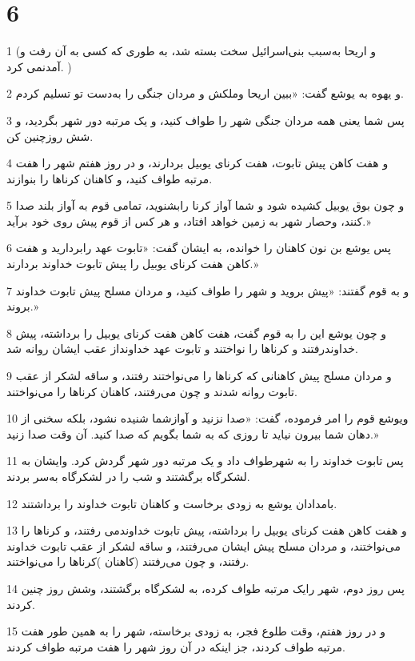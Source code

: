 \chapter{6}

\par 1 (و اریحا به‌سبب بنی‌اسرائیل سخت بسته شد، به طوری که کسی به آن رفت و آمدنمی کرد. )
\par 2 و یهوه به یوشع گفت: «ببین اریحا وملکش و مردان جنگی را به‌دست تو تسلیم کردم.
\par 3 پس شما یعنی همه مردان جنگی شهر را طواف کنید، و یک مرتبه دور شهر بگردید، و شش روزچنین کن.
\par 4 و هفت کاهن پیش تابوت، هفت کرنای یوبیل بردارند، و در روز هفتم شهر را هفت مرتبه طواف کنید، و کاهنان کرناها را بنوازند.
\par 5 و چون بوق یوبیل کشیده شود و شما آواز کرنا رابشنوید، تمامی قوم به آواز بلند صدا کنند، وحصار شهر به زمین خواهد افتاد، و هر کس از قوم پیش روی خود برآید.»
\par 6 پس یوشع بن نون کاهنان را خوانده، به ایشان گفت: «تابوت عهد رابردارید و هفت کاهن هفت کرنای یوبیل را پیش تابوت خداوند بردارند.»
\par 7 و به قوم گفتند: «پیش بروید و شهر را طواف کنید، و مردان مسلح پیش تابوت خداوند بروند.»
\par 8 و چون یوشع این را به قوم گفت، هفت کاهن هفت کرنای یوبیل را برداشته، پیش خداوندرفتند و کرناها را نواختند و تابوت عهد خداونداز عقب ایشان روانه شد.
\par 9 و مردان مسلح پیش کاهنانی که کرناها را می‌نواختند رفتند، و ساقه لشکر از عقب تابوت روانه شدند و چون می‌رفتند، کاهنان کرناها را می‌نواختند.
\par 10 ویوشع قوم را امر فرموده، گفت: «صدا نزنید و آوازشما شنیده نشود، بلکه سخنی از دهان شما بیرون نیاید تا روزی که به شما بگویم که صدا کنید. آن وقت صدا زنید.»
\par 11 پس تابوت خداوند را به شهرطواف داد و یک مرتبه دور شهر گردش کرد. وایشان به لشکرگاه برگشتند و شب را در لشکرگاه به‌سر بردند.
\par 12 بامدادان یوشع به زودی برخاست و کاهنان تابوت خداوند را برداشتند.
\par 13 و هفت کاهن هفت کرنای یوبیل را برداشته، پیش تابوت خداوندمی رفتند، و کرناها را می‌نواختند، و مردان مسلح پیش ایشان می‌رفتند، و ساقه لشکر از عقب تابوت خداوند رفتند، و چون می‌رفتند (کاهنان )کرناها را می‌نواختند.
\par 14 پس روز دوم، شهر رایک مرتبه طواف کرده، به لشکرگاه برگشتند، وشش روز چنین کردند.
\par 15 و در روز هفتم، وقت طلوع فجر، به زودی برخاسته، شهر را به همین طور هفت مرتبه طواف کردند، جز اینکه در آن روز شهر را هفت مرتبه طواف کردند.
